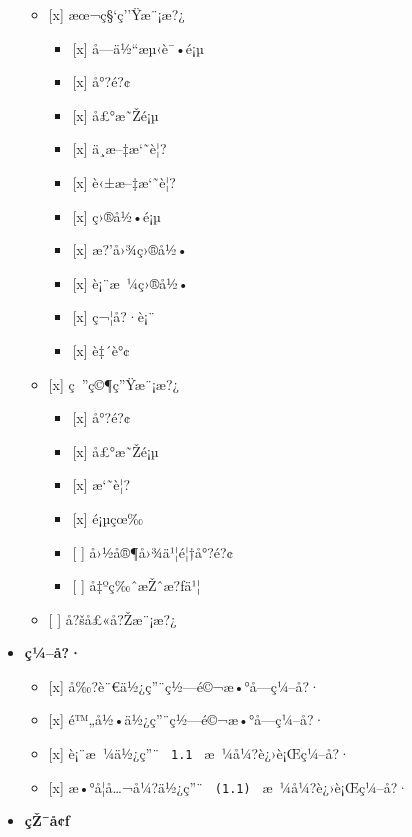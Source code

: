 \begin{itemize}
  \begin{itemize}
  \tightlist
  \item
    {[}x{]} æœ¬ç§`ç''Ÿæ¨¡æ?¿

    \begin{itemize}
    \tightlist
    \item
      {[}x{]} å­---ä½``æµ‹è¯•é¡µ
    \item
      {[}x{]} å°?é?¢
    \item
      {[}x{]} å£°æ˜Žé¡µ
    \item
      {[}x{]} ä¸­æ--‡æ`˜è¦?
    \item
      {[}x{]} è‹±æ--‡æ`˜è¦?
    \item
      {[}x{]} ç›®å½•é¡µ
    \item
      {[}x{]} æ?'å›¾ç›®å½•
    \item
      {[}x{]} è¡¨æ~¼ç›®å½•
    \item
      {[}x{]} ç¬¦å?·è¡¨
    \item
      {[}x{]} è‡´è°¢
    \end{itemize}
  \item
    {[}x{]} ç~''ç©¶ç''Ÿæ¨¡æ?¿

    \begin{itemize}
    \tightlist
    \item
      {[}x{]} å°?é?¢
    \item
      {[}x{]} å£°æ˜Žé¡µ
    \item
      {[}x{]} æ`˜è¦?
    \item
      {[}x{]} é¡µçœ‰
    \item
      {[} {]} å›½å®¶å›¾ä¹¦é¦†å°?é?¢
    \item
      {[} {]} å‡ºç‰ˆæŽˆæ?ƒä¹¦
    \end{itemize}
  \item
    {[} {]} å?šå£«å?Žæ¨¡æ?¿
  \end{itemize}
\item
  \textbf{ç¼--å?·}

  \begin{itemize}
  \tightlist
  \item
    {[}x{]} å‰?è¨€ä½¿ç''¨ç½---é©¬æ•°å­---ç¼--å?·
  \item
    {[}x{]} é™„å½•ä½¿ç''¨ç½---é©¬æ•°å­---ç¼--å?·
  \item
    {[}x{]} è¡¨æ~¼ä½¿ç''¨ \texttt{\ 1.1\ } æ~¼å¼?è¿›è¡Œç¼--å?·
  \item
    {[}x{]} æ•°å­¦å\ldots¬å¼?ä½¿ç''¨ \texttt{\ (1.1)\ }
    æ~¼å¼?è¿›è¡Œç¼--å?·
  \end{itemize}
\item
  \textbf{çŽ¯å¢ƒ}


\end{itemize}
